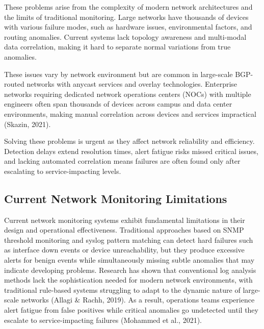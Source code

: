 \documentclass[11pt]{article}
\begin{document}
These problems arise from the complexity of modern network architectures and the limits of traditional monitoring. Large networks have thousands of devices with various failure modes, such as hardware issues, environmental factors, and routing anomalies. Current systems lack topology awareness and multi-modal data correlation, making it hard to separate normal variations from true anomalies.

These issues vary by network environment but are common in large-scale BGP-routed networks with anycast services and overlay technologies. Enterprise networks requiring dedicated network operations centers (NOCs) with multiple engineers often span thousands of devices across campus and data center environments, making manual correlation across devices and services impractical (Skazin, 2021).

Solving these problems is urgent as they affect network reliability and efficiency. Detection delays extend resolution times, alert fatigue risks missed critical issues, and lacking automated correlation means failures are often found only after escalating to service-impacting levels.

\subsection{Current Network Monitoring Limitations}

Current network monitoring systems exhibit fundamental limitations in their design and operational effectiveness. Traditional approaches based on SNMP threshold monitoring and syslog pattern matching can detect hard failures such as interface down events or device unreachability, but they produce excessive alerts for benign events while simultaneously missing subtle anomalies that may indicate developing problems. Research has shown that conventional log analysis methods lack the sophistication needed for modern network environments, with traditional rule-based systems struggling to adapt to the dynamic nature of large-scale networks (Allagi \& Rachh, 2019). As a result, operations teams experience alert fatigue from false positives while critical anomalies go undetected until they escalate to service-impacting failures (Mohammed et al., 2021).
\end{document}
